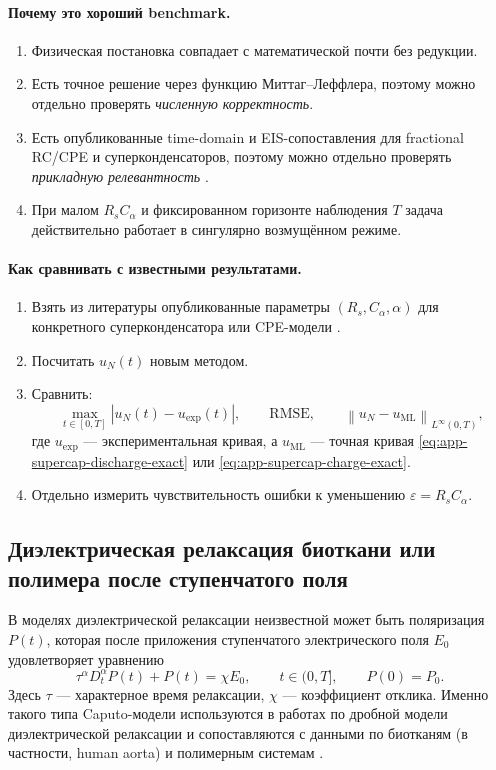 \documentclass[12pt,a4paper]{article}
\theoremstyle{definition}
\newcommand{\eps}{\varepsilon}
\newcommand{\norm}[1]{\left\lVert #1 \right\rVert}
\begin{document}
\paragraph{Почему это хороший benchmark.}
\begin{enumerate}[label=\textup{(\roman*)}]
\item Физическая постановка совпадает с математической почти без редукции.
\item Есть точное решение через функцию Миттаг--Леффлера, поэтому можно отдельно
проверять \emph{численную корректность}.
\item Есть опубликованные time-domain и EIS-сопоставления для fractional RC/CPE
и суперконденсаторов, поэтому можно отдельно проверять \emph{прикладную релевантность}
\cite{lopez2022cpe,kothari2021supercap,wang2020ultracap}.
\item При малом $R_s C_\alpha$ и фиксированном горизонте наблюдения $T$
задача действительно работает в сингулярно возмущённом режиме.
\end{enumerate}

\paragraph{Как сравнивать с известными результатами.}
\begin{enumerate}[label=\textup{(\alph*)}]
\item Взять из литературы опубликованные параметры $(R_s,C_\alpha,\alpha)$
для конкретного суперконденсатора или CPE-модели \cite{kothari2021supercap,wang2020ultracap}.
\item Посчитать $u_N(t)$ новым методом.
\item Сравнить:
\[
\max_{t\in[0,T]} |u_N(t)-u_{\mathrm{exp}}(t)|,
\qquad
\mathrm{RMSE},
\qquad
\norm{u_N-u_{\mathrm{ML}}}_{L^\infty(0,T)},
\]
где $u_{\mathrm{exp}}$ --- экспериментальная кривая, а $u_{\mathrm{ML}}$ ---
точная кривая \eqref{eq:app-supercap-discharge-exact} или
\eqref{eq:app-supercap-charge-exact}.
\item Отдельно измерить чувствительность ошибки к уменьшению $\eps=R_sC_\alpha$.
\end{enumerate}

\subsection{Диэлектрическая релаксация биоткани или полимера после ступенчатого поля}
\label{app:dielectric}

В моделях диэлектрической релаксации неизвестной может быть поляризация $P(t)$,
которая после приложения ступенчатого электрического поля $E_0$ удовлетворяет
уравнению
\begin{equation}
\label{eq:app-dielectric}
\tau^\alpha D_t^\alpha P(t)+P(t)=\chi E_0,
\qquad
t\in(0,T],
\qquad
P(0)=P_0.
\end{equation}
Здесь $\tau$ --- характерное время релаксации, $\chi$ --- коэффициент отклика.
Именно такого типа Caputo-модели используются в работах по дробной модели
диэлектрической релаксации и сопоставляются с данными по биотканям
(в частности, human aorta) и полимерным системам \cite{ciancio2017dielectric,renteria2025polymer}.
\end{document}
